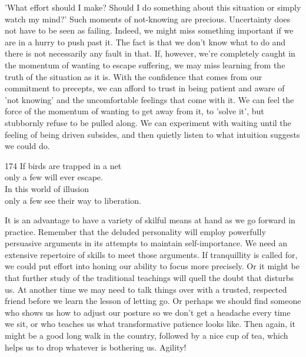 \begin{dhpRefl}
  'What effort should I make? Should I do something about this situation or
  simply watch my mind?' Such moments of not-knowing are precious. Uncertainty
  does not have to be seen as failing. Indeed, we might miss something important
  if we are in a hurry to push past it. The fact is that we don't know what to
  do and there is not necessarily any fault in that. If, however, we're
  completely caught in the momentum of wanting to escape suffering, we may miss
  learning from the truth of the situation as it is. With the confidence that
  comes from our commitment to precepts, we can afford to trust in being patient
  and aware of 'not knowing' and the uncomfortable feelings that come with it.
  We can feel the force of the momentum of wanting to get away from it, to
  'solve it', but stubbornly refuse to be pulled along. We can experiment with
  waiting until the feeling of being driven subsides, and then quietly listen to
  what intuition suggests we could do.
\end{dhpRefl}


\begin{dhpVerse}{174}
\label{dhp-174}
If birds are trapped in a net\\
only a few will ever escape.\\
In this world of illusion\\
only a few see their way to liberation.
\end{dhpVerse}

\begin{dhpRefl}
  It is an advantage to have a variety of skilful means at hand as we go forward
  in practice. Remember that the deluded personality will employ powerfully
  persuasive arguments in its attempts to maintain self-importance. We need an
  extensive repertoire of skills to meet those arguments. If tranquillity is
  called for, we could put effort into honing our ability to focus more
  precisely. Or it might be that further study of the traditional teachings will
  quell the doubt that disturbs us. At another time we may need to talk things
  over with a trusted, respected friend before we learn the lesson of letting
  go. Or perhaps we should find someone who shows us how to adjust our posture
  so we don’t get a headache every time we sit, or who teaches us what
  transformative patience looks like. Then again, it might be a good long walk
  in the country, followed by a nice cup of tea, which helps us to drop whatever
  is bothering us. Agility!
\end{dhpRefl}

